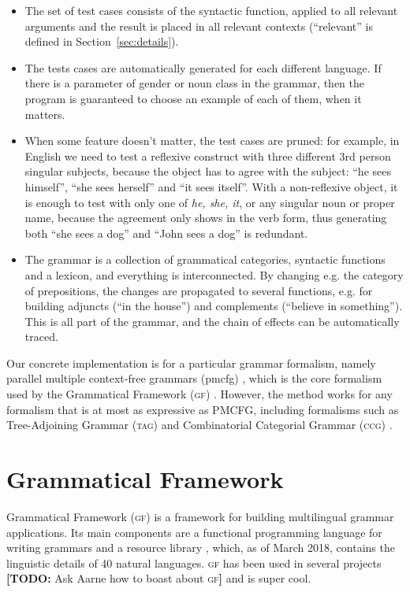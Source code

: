 \documentclass[11pt]{article}
\def\gf{\textsc{gf}}
\def\ccg{\textsc{ccg}}
\def\tag{\textsc{tag}}
\newcommand{\todo}[1]{{\color{cyan}\textbf{[TODO: }#1\textbf{]}}}
\begin{document}
\begin{itemize}
\item The set of test cases consists of the syntactic function, applied
  to all relevant arguments and the result is placed in all relevant
  contexts (``relevant'' is defined in
  Section~\ref{sec:details}).
\item The tests cases are automatically generated for each different
  language. If there is a parameter of gender or noun class in the
  grammar, then the program is guaranteed to choose an example of each
  of them, when it matters.
\item When some feature doesn't matter, the test cases are pruned: for
  example, in English we need to test a reflexive construct with three
  different 3rd person singular subjects, because the object has to
  agree with the subject: ``he sees himself'', ``she sees herself''
  and ``it sees itself''. With a non-reflexive object, it is
  enough to test with only one of \emph{he, she, it}, or any singular
  noun or proper name, because the agreement only shows in the verb
  form, thus generating both ``she sees a dog'' and ``John sees a
  dog'' is redundant.
\item The grammar is a collection of grammatical categories, syntactic
  functions and a lexicon, and everything is interconnected. By
  changing e.g. the category of prepositions, the changes are
  propagated to several functions, e.g. for building adjuncts (``in
  the house'') and complements (``believe in something''). This is
  all part of the grammar, and the chain of effects can be
  automatically traced. 
\end{itemize}

Our concrete implementation is for a particular grammar formalism, namely parallel multiple context-free grammars ({\sc pmcfg}) \cite{seki91pmcfg}, which is the core formalism used by the Grammatical Framework (\gf) \cite{ranta2004gf}. However, the method works for any formalism that is at most as expressive as PMCFG, including formalisms such as Tree-Adjoining Grammar (\tag) \cite{joshi1975tag} and Combinatorial Categorial Grammar (\ccg) \cite{steedman1988ccg}.

\section{Grammatical Framework} \label{sec:gf}
Grammatical Framework (\gf) \cite{ranta2004gf} 
is a framework for building multilingual grammar applications. Its main
components are a functional programming language for writing grammars
and a resource library \cite{ranta2009rgl}, which, as of March 2018,
contains the linguistic details of 40 natural languages. \gf{} has
been used in several projects \todo{Ask Aarne how to boast about \gf} and
is super cool.
\end{document}
